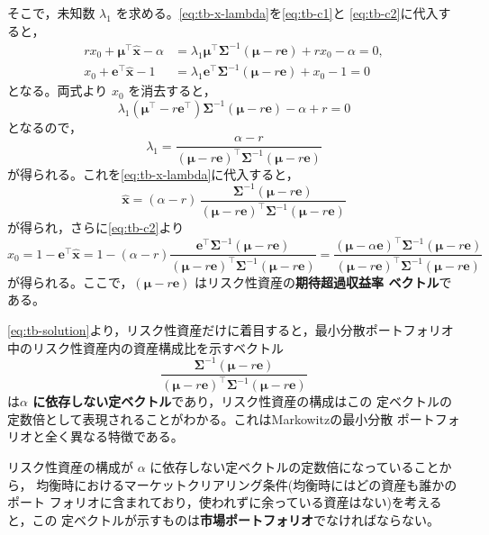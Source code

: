 そこで，未知数 $\lambda_1$ を求める。\eqref{eq:tb-x-lambda}を\eqref{eq:tb-c1}と
\eqref{eq:tb-c2}に代入すると，
\begin{align}
r x_0 + \bm{\mu}^\top\hat{\bm{x}} - \alpha
&= \lambda_1\bm{\mu}^\top\bm{\Sigma}^{-1}(\bm{\mu}-r\bm{e}) + rx_0 - \alpha = 0,\\
x_0 + \bm{e}^\top\hat{\bm{x}} - 1
&= \lambda_1\bm{e}^\top\bm{\Sigma}^{-1}(\bm{\mu}-r\bm{e}) + x_0 - 1 = 0
\end{align}
となる。両式より $x_0$ を消去すると，
\begin{equation}
\lambda_1(\bm{\mu}^\top - r\bm{e}^\top)\bm{\Sigma}^{-1}(\bm{\mu}-r\bm{e})
- \alpha + r = 0
\end{equation}
となるので，
\begin{equation}
\lambda_1 = \frac{\alpha - r}
{(\bm{\mu}-r\bm{e})^\top\bm{\Sigma}^{-1}(\bm{\mu}-r\bm{e})}
\end{equation}
が得られる。これを\eqref{eq:tb-x-lambda}に代入すると，
\begin{equation}
\hat{\bm{x}} = (\alpha - r)\,
\frac{\bm{\Sigma}^{-1}(\bm{\mu}-r\bm{e})}
{(\bm{\mu}-r\bm{e})^\top\bm{\Sigma}^{-1}(\bm{\mu}-r\bm{e})}
\label{eq:tb-solution}
\end{equation}
が得られ，さらに\eqref{eq:tb-c2}より
\begin{equation}
\hat x_0 = 1 - \bm{e}^\top\hat{\bm{x}}
= 1 - (\alpha-r)\frac{\bm{e}^\top\bm{\Sigma}^{-1}(\bm{\mu}-r\bm{e})}
{(\bm{\mu}-r\bm{e})^\top\bm{\Sigma}^{-1}(\bm{\mu}-r\bm{e})}
= \frac{(\bm{\mu}-\alpha\bm{e})^\top\bm{\Sigma}^{-1}(\bm{\mu}-r\bm{e})}
{(\bm{\mu}-r\bm{e})^\top\bm{\Sigma}^{-1}(\bm{\mu}-r\bm{e})}
\end{equation}
が得られる。ここで，$(\bm{\mu}-r\bm{e})$ はリスク性資産の\textbf{期待超過収益率
ベクトル}である。

\eqref{eq:tb-solution}より，リスク性資産だけに着目すると，最小分散ポートフォリオ
中のリスク性資産内の資産構成比を示すベクトル
\begin{equation}
\frac{\bm{\Sigma}^{-1}(\bm{\mu}-r\bm{e})}
{(\bm{\mu}-r\bm{e})^\top\bm{\Sigma}^{-1}(\bm{\mu}-r\bm{e})}
\label{eq:tb-risky-comp}
\end{equation}
は\textbf{$\alpha$ に依存しない定ベクトル}であり，リスク性資産の構成はこの
定ベクトルの定数倍として表現されることがわかる。これはMarkowitzの最小分散
ポートフォリオと全く異なる特徴である。

\begin{remark}
リスク性資産の構成が $\alpha$ に依存しない定ベクトルの定数倍になっていることから，
均衡時におけるマーケットクリアリング条件(均衡時にはどの資産も誰かのポート
フォリオに含まれており，使われずに余っている資産はない)を考えると，この
定ベクトルが示すものは\textbf{市場ポートフォリオ}でなければならない。
\end{remark}

